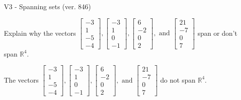 \begin{exercise}
  \begin{exerciseTitle}V3 - Spanning sets (ver. 846)\end{exerciseTitle}
  \begin{exerciseStatement}
    Explain why the vectors \(\left[\begin{array}{r}
-3 \\
1 \\
-5 \\
-4
\end{array}\right] , \left[\begin{array}{r}
-3 \\
1 \\
0 \\
-1
\end{array}\right] , \left[\begin{array}{r}
6 \\
-2 \\
0 \\
2
\end{array}\right] , \text{ and } \left[\begin{array}{r}
21 \\
-7 \\
0 \\
7
\end{array}\right]\) span or don't span \(\mathbb{R}^4\). 
	


  \end{exerciseStatement}
  \begin{exerciseAnswer}
   The vectors \(\left[\begin{array}{r}
-3 \\
1 \\
-5 \\
-4
\end{array}\right] , \left[\begin{array}{r}
-3 \\
1 \\
0 \\
-1
\end{array}\right] , \left[\begin{array}{r}
6 \\
-2 \\
0 \\
2
\end{array}\right] , \text{ and } \left[\begin{array}{r}
21 \\
-7 \\
0 \\
7
\end{array}\right]\) 
  	 do not  
	span \(\mathbb{R}^4\).
  


  \end{exerciseAnswer}
\end{exercise}